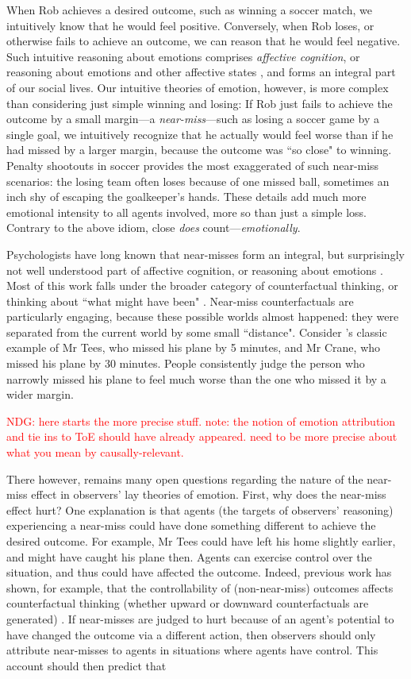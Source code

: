 \documentclass[10pt,letterpaper]{article}
\newcommand{\red}[1]{\textcolor{Red}{#1}}
\begin{document}
	When Rob achieves a desired outcome, such as winning a soccer match, we intuitively know that he would feel positive. Conversely, when Rob loses, or otherwise fails to achieve an outcome, we can reason that he would feel negative. Such intuitive reasoning about emotions comprises \textit{affective cognition}, or reasoning about emotions and other affective states \cite{OngAffCog}, and forms an integral part of our social lives. Our intuitive theories of emotion, however, is more complex than considering just simple winning and losing: If Rob just fails to achieve the outcome by a small margin---a \textit{near-miss}---such as losing a soccer game by a single goal, we intuitively recognize that he actually would feel worse than if he had missed by a larger margin, because the outcome was ``so close" to winning. Penalty shootouts in soccer provides the most exaggerated of such near-miss scenarios: the losing team often loses because of one missed ball, sometimes an inch shy of escaping the goalkeeper's hands. These details add much more emotional intensity to all agents involved, more so than just a simple loss. Contrary to the above idiom, close \textit{does} count---\textit{emotionally}.
	
	Psychologists have long known that near-misses form an integral, but surprisingly not well understood part of affective cognition, or reasoning about emotions \cite{Johnson1986, Gleicher1990}. Most of this work falls under the broader category of counterfactual thinking, or thinking about ``what might have been" \cite{Bryne2002,McMullen2002, Medvec1997, Roese1997}. Near-miss counterfactuals are particularly engaging, because these possible worlds almost happened: they were separated from the current world by some small ``distance". Consider 's classic example of Mr Tees, who missed his plane by 5 minutes, and Mr Crane, who missed his plane by 30 minutes. People consistently judge the person who narrowly missed his plane to feel much worse than the one who missed it by a wider margin.
	
	
	\red{NDG: here starts the more precise stuff. note: the notion of emotion attribution and tie ins to ToE should have already appeared. need to be more precise about what you mean by causally-relevant.}

	There however, remains many open questions regarding the nature of the near-miss effect in observers' lay theories of emotion. First, why does the near-miss effect hurt? One explanation is that agents (the targets of observers' reasoning) experiencing a near-miss could have done something different to achieve the desired outcome. For example, Mr Tees could have left his home slightly earlier, and might have caught his plane then. Agents can exercise control over the situation, and thus could have affected the outcome. Indeed, previous work has shown, for example, that the controllability of (non-near-miss) outcomes affects counterfactual thinking (whether upward or downward counterfactuals are generated) \cite{Roese1995}. If near-misses are judged to hurt because of an agent's potential to have changed the outcome via a different action, then observers should only attribute near-misses to agents in situations where agents have control. This account should then predict that 
	
\end{document}
